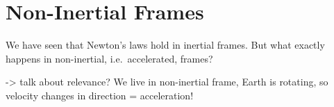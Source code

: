 \documentclass[../class_mech_main.tex]{subfiles}
\begin{document}
    \section{Non-Inertial Frames}\label{sec:non_inertial_frames}
% 
% 
We have seen that Newton's laws hold in inertial frames. But what exactly happens in non-inertial, i.e.~accelerated, frames?

-> talk about relevance? We live in non-inertial frame, Earth is rotating, so velocity changes in direction = acceleration!

\end{document}
